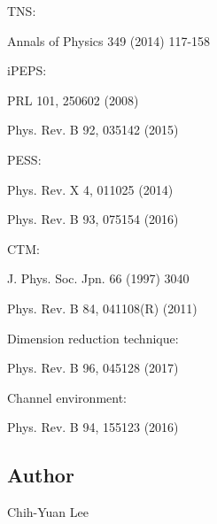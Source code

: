 \begin{DoxyItemize}
\item T\+NS\+:
\begin{DoxyItemize}
\item Annals of Physics 349 (2014) 117-\/158
\end{DoxyItemize}
\item i\+P\+E\+PS\+:
\begin{DoxyItemize}
\item P\+RL 101, 250602 (2008)
\item Phys. Rev. B 92, 035142 (2015)
\end{DoxyItemize}
\item P\+E\+SS\+:
\begin{DoxyItemize}
\item Phys. Rev. X 4, 011025 (2014)
\item Phys. Rev. B 93, 075154 (2016)
\end{DoxyItemize}
\item C\+TM\+:
\begin{DoxyItemize}
\item J. Phys. Soc. Jpn. 66 (1997) 3040
\item Phys. Rev. B 84, 041108(R) (2011)
\end{DoxyItemize}
\item Dimension reduction technique\+:
\begin{DoxyItemize}
\item Phys. Rev. B 96, 045128 (2017)
\end{DoxyItemize}
\item Channel environment\+:
\begin{DoxyItemize}
\item Phys. Rev. B 94, 155123 (2016)
\end{DoxyItemize}
\end{DoxyItemize}

\subsection*{Author}

Chih-\/\+Yuan Lee 
